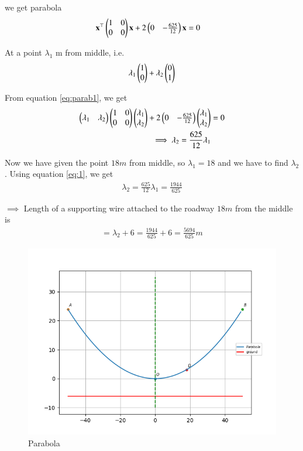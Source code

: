 \documentclass[journal,12pt,twocolumn]{IEEEtran}
\renewcommand{\vec}[1]{\boldsymbol{\mathbf{#1}}}
\begin{document}
we get parabola
\begin{align}
    \label{eq:parab1} \vec{x}^\top\myvec{1&0\\0&0}\vec{x} + 2\myvec{0 & -\frac{625}{12}}\vec{x} &= 0 
\end{align}

At a point $\lambda_1$ m from middle, i.e.
\begin{align}
    \lambda_1\begin{pmatrix}1\\0\end{pmatrix} + \lambda_2\begin{pmatrix}0\\1\end{pmatrix}
\end{align}

From equation \eqref{eq:parab1}, we get
\begin{align}
    \begin{pmatrix}\lambda_1&\lambda_2\end{pmatrix}\begin{pmatrix}1&0\\0&0\end{pmatrix}\begin{pmatrix}\lambda_1\\\lambda_2\end{pmatrix} + 2\begin{pmatrix}0 & -\frac{625}{12}\end{pmatrix}\begin{pmatrix}\lambda_1\\\lambda_2\end{pmatrix} &= 0\\
    \label{eq:1} \implies \lambda_2 = \frac{625}{12}\lambda_1
\end{align}

Now we have given the point $18 m$ from middle, so $\lambda_1 = 18$ and we have to find $\lambda_2$.
Using equation \eqref{eq:1}, we get
\begin{align}
    \lambda_2 = \frac{625}{12}\lambda_1 = \frac{1944}{625}
\end{align}

$\implies$ Length of a supporting wire attached to the roadway $18 m$ from the middle is 
\begin{align}
    = \lambda_2 + 6 =  \frac{1944}{625} + 6 = \frac{5694}{625} m   
\end{align}

\begin{figure}[!htb]
    \centering
    \includegraphics[width=\columnwidth]{figs/parabola.png}
    \caption{Parabola}
    \label{fig:parabola}
\end{figure}
\end{document}
